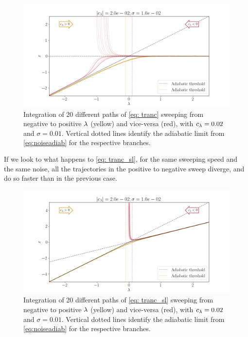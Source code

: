 \begin{figure}[htb]
	\centering
	\includegraphics[width=\linewidth]{Images/Metrics/nonnormality/transcr}
	\caption{Integration of 20 different paths of \cref{eq: tranc} sweeping from negative to positive $\lambda$ (yellow) and vice-versa (red), with $c_\lambda=0.02$ and $\sigma=0.01$. Vertical dotted lines identify the adiabatic limit from \cref{eq:noiseadiab} for the respective branches. }
	\label{fig:transcr}
\end{figure}

If we look to what happens to \cref{eq: tranc_sl}, for the same sweeping speed and the same noise, all the trajectories in the positive to negative sweep diverge, and do so faster than in the previous case. 

\begin{figure}[htb]
	\centering
	\includegraphics[width=\linewidth]{Images/Metrics/nonnormality/transcr_sla}
	\caption{Integration of 20 different paths of \cref{eq: tranc_sl} sweeping from negative to positive $\lambda$ (yellow) and vice-versa (red), with $c_\lambda=0.02$ and $\sigma=0.01$.  Vertical dotted lines identify the adiabatic limit from \cref{eq:noiseadiab} for the respective branches.}
	\label{fig:transcrsla}
\end{figure}

